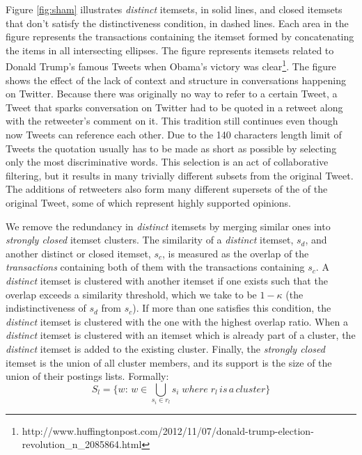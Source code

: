 \documentclass{sig-alternate}
\begin{document}
Figure \ref{fig:sham} illustrates \emph{distinct} itemsets, in solid lines, and closed itemsets that don't satisfy the distinctiveness condition, in dashed lines. Each area in the figure represents the transactions containing the itemset formed by concatenating the items in all intersecting ellipses.  
The figure represents itemsets related to Donald Trump's famous 
Tweets when Obama's victory was clear\footnote{http://www.huffingtonpost.com/2012/11/07/donald-trump-election-revolution\_n\_2085864.html}.  The figure shows the effect of the lack of context and structure in conversations happening on Twitter. Because there was originally no way to refer to a certain Tweet, a Tweet that sparks conversation on Twitter had  to be quoted in a retweet along with the retweeter's comment on it. This tradition still continues even though now Tweets can reference each other. 
Due to the 140 characters length limit of Tweets the quotation usually has to be made as short as possible by selecting only the most discriminative words. This selection is an act of collaborative filtering, but it results in many trivially different subsets from the original Tweet. The additions of retweeters also form many different supersets of the of the original Tweet, some of which represent highly supported opinions. 

We remove the redundancy in \emph{distinct} itemsets by merging similar ones into \emph{strongly closed} itemset clusters. The similarity of a \emph{distinct} itemset, $s_d$, and another distinct or closed itemset, $s_c$, is measured as the overlap of the \emph{transactions} containing both of them with the transactions containing $s_c$.  A \emph{distinct} itemset is clustered with another itemset if one exists such that the overlap exceeds a similarity threshold, which we take to be $1-\kappa$ (the indistinctiveness of $s_d$ from $s_c$).
If more than one satisfies this condition, the  \emph{distinct} itemset is clustered with the one with the highest overlap ratio. When  a \emph{distinct} itemset is clustered with an itemset which is already part of a cluster, the \emph{distinct} itemset is added to the existing cluster. Finally, the \emph{strongly closed} itemset is the 
union of all cluster members, and its support is the size of the union of their postings lists. Formally:
\begin{equation}S_l = \{w:\, w \in \bigcup_{s_i \in r_l}{s_i} \; where \; r_l \, is \, a\, cluster\}\end{equation}
\end{document}
